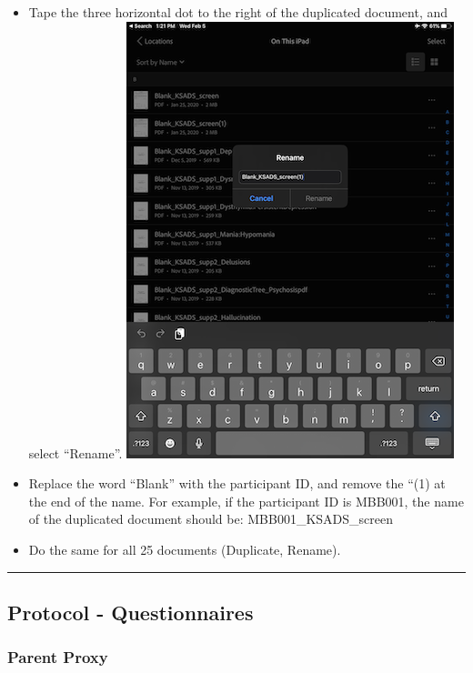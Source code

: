 \documentclass[]{book}
\begin{document}
\begin{itemize}
\begin{itemize}
  \item
    Tape the three horizontal dot to the right of the duplicated document, and select ``Rename''.
    \includegraphics{images/ksads/6.png}
  \item
    Replace the word ``Blank'' with the participant ID, and remove the ``(1) at the end of the name. For example, if the participant ID is MBB001, the name of the duplicated document should be: MBB001\_KSADS\_screen
  \item
    Do the same for all 25 documents (Duplicate, Rename).
  \end{itemize}
\end{itemize}

\begin{center}\rule{0.5\linewidth}{0.5pt}\end{center}

\hypertarget{protocol---questionnaires}{%
\subsection{Protocol - Questionnaires}\label{protocol---questionnaires}}

\hypertarget{parent-proxy-1}{%
\subsubsection{Parent Proxy}\label{parent-proxy-1}}
\end{document}
